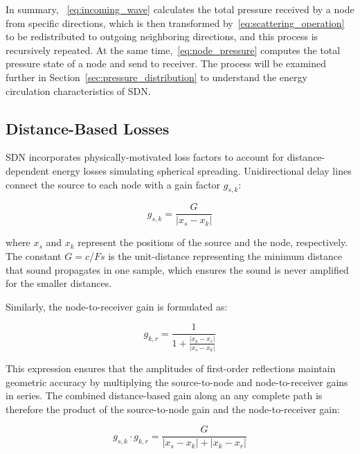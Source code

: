 \documentclass[journal]{IEEEtran}
\begin{document}
In summary, ~\eqref{eq:incoming_wave} calculates the total pressure received by a node from specific directions, which is then transformed by~\eqref{eq:scattering_operation} to be redistributed to outgoing neighboring directions, and this process is recursively repeated. At the same time,~\eqref{eq:node_pressure} computes the total pressure state of a node and send to receiver. The process will be examined further in Section~\ref{sec:pressure_distribution} to understand the energy circulation characteristics of SDN.


\subsection{Distance-Based Losses}
\label{sec:distance_based_attenuations}

SDN incorporates physically-motivated loss factors to account for distance-dependent
energy losses simulating spherical spreading. Unidirectional delay lines
connect the source to each node with a gain factor \(g_{s,k}\):

\begin{equation}
\label{eq:source_node_gain}
g_{s,k} = \frac{G}{|x_s - x_k|}
\end{equation}

where \(x_s\) and \(x_k\) represent the positions of the source and the
node, respectively. The constant \(G = c/Fs\) is the unit-distance
representing the minimum distance that sound propagates in one sample,
which ensures the sound is never amplified for the smaller distances. 

Similarly, the node-to-receiver gain is formulated as:

\begin{equation}
\label{eq:node_receiver_gain}
g_{k,r} = \frac{1}{1 + \frac{|x_k - x_r|}{|x_s - x_k|}}
\end{equation}

This expression ensures that the amplitudes of first-order reflections
maintain geometric accuracy by multiplying the source-to-node and node-to-receiver gains in series. The
combined distance-based gain along an any complete path is therefore the
product of the source-to-node gain and the node-to-receiver gain:

\begin{equation}
\label{eq:combined_gain}
g_{s,k} \cdot g_{k,r} = \frac{G}{|x_s - x_k| + |x_k - x_r|}
\end{equation}
\end{document}
